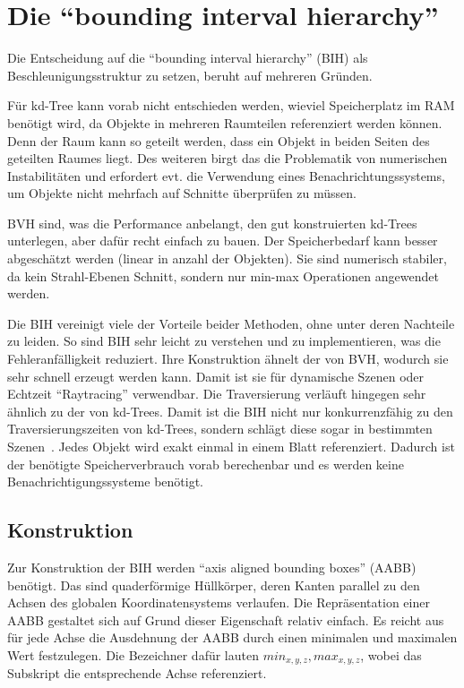 \section{Die "`bounding interval hierarchy"'}

Die Entscheidung auf die "`bounding interval hierarchy"' (BIH) als Beschleunigungsstruktur zu setzen, beruht auf mehreren Gründen.

Für kd-Tree kann vorab nicht entschieden werden, wieviel Speicherplatz im RAM benötigt wird, da Objekte in mehreren Raumteilen referenziert werden können. Denn der Raum kann so geteilt werden, dass ein Objekt in beiden Seiten des geteilten Raumes liegt. Des weiteren birgt das die Problematik von numerischen Instabilitäten und erfordert evt. die Verwendung eines Benachrichtungssystems, um Objekte nicht mehrfach auf Schnitte überprüfen zu müssen.

BVH sind, was die Performance anbelangt, den gut konstruierten kd-Trees unterlegen,
aber dafür recht einfach zu bauen. Der Speicherbedarf kann besser abgeschätzt werden (linear in anzahl der Objekten).
Sie sind numerisch stabiler, da kein Strahl-Ebenen Schnitt, sondern nur min-max Operationen angewendet werden.

Die BIH vereinigt viele der Vorteile beider Methoden, ohne unter deren Nachteile zu leiden.
So sind BIH sehr leicht zu verstehen und zu implementieren, was die Fehleranfälligkeit reduziert. Ihre Konstruktion ähnelt der von BVH, wodurch sie sehr schnell erzeugt werden kann. Damit ist sie für dynamische Szenen oder Echtzeit "`Raytracing"' verwendbar. Die Traversierung verläuft hingegen sehr ähnlich zu der von kd-Trees. Damit ist die BIH nicht nur konkurrenzfähig zu den Traversierungszeiten von kd-Trees, sondern schlägt diese sogar in bestimmten Szenen~\cite{wachter2006InsRayTraBouIntHie}. Jedes Objekt wird exakt einmal in einem Blatt referenziert. Dadurch ist der benötigte Speicherverbrauch vorab berechenbar und es werden keine Benachrichtigungssysteme benötigt.

\subsection{Konstruktion}

Zur Konstruktion der BIH werden "`axis aligned bounding boxes"' (AABB) benötigt. Das sind quaderförmige Hüllkörper, deren Kanten parallel zu den Achsen des globalen Koordinatensystems verlaufen. Die Repräsentation einer AABB gestaltet sich auf Grund dieser Eigenschaft relativ einfach. Es reicht aus für jede Achse die Ausdehnung der AABB durch einen minimalen und maximalen Wert festzulegen. Die Bezeichner dafür lauten \( min_{x,y,z}, max_{x,y,z} \), wobei das Subskript die entsprechende Achse referenziert.
 
